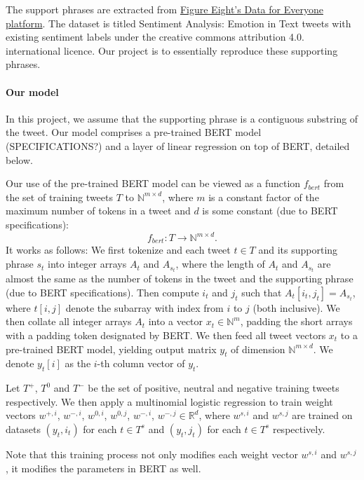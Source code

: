 The support phrases are extracted from \href{https://appen.com/resources/datasets/}{Figure Eight's Data for Everyone platform}. The dataset is titled Sentiment Analysis: Emotion in Text tweets with existing sentiment labels under the creative commons attribution 4.0. international licence. Our project is to essentially reproduce these supporting phrases.



\paragraph{Our model}

In this project, we assume that the supporting phrase is a contiguous substring of the tweet. Our model comprises a pre-trained BERT model (SPECIFICATIONS?) and a layer of linear regression on top of BERT, detailed below. 

Our use of the pre-trained BERT model can be viewed as a function $f_{bert}$ from the set of training tweets $T$ to $\mathbb{N}^{m \times d}$, where $m$ is a constant factor of the maximum number of tokens in a tweet and $d$ is some constant (due to BERT specifications): $$f_{bert}: T \rightarrow \mathbb{N}^{m \times d}.$$ It works as follows: We first tokenize and each tweet $t \in T$ and its supporting phrase $s_t$ into integer arrays $A_t$ and $A_{s_t}$, where the length of $A_t$ and $A_{s_t}$ are almost the same as the number of tokens in the tweet and the supporting phrase (due to BERT specifications). Then compute $i_{t}$ and $j_{t}$ such that $A_t[i_{t}, j_{t}] = A_{s_t}$, where $t[i,j]$ denote the subarray with index from $i$ to $j$ (both inclusive). We then collate all integer arrays $A_t$ into a vector  $x_t \in \mathbb{N}^{m}$, padding the short arrays with a padding token designated by BERT. We then feed all tweet vectors $x_t$ to a pre-trained BERT model, yielding output matrix $y_t$ of dimension $\mathbb{N}^{m \times d}$. We denote $y_t[i]$ as the $i$-th column vector of $y_t$.

Let $T^+$, $T^0$ and $T^-$ be the set of positive, neutral and negative training tweets respectively. We then apply a multinomial logistic regression to train weight vectors $w^{+,i}$, $w^{-,i}$, $w^{0,i}$, $w^{0,j}$, $w^{-,i}$, $w^{-,j} \in \mathbb{R}^d$, where $w^{s,i}$ and $w^{s, j}$ are trained on datasets $(y_{t}, i_t)$ for each $t \in T^s$ and $(y_{t}, j_t)$ for each $t \in T^s$ respectively.


Note that this training process not only modifies each weight vector $w^{s, i}$ and $w^{s, j}$, it modifies the parameters in BERT as well.


